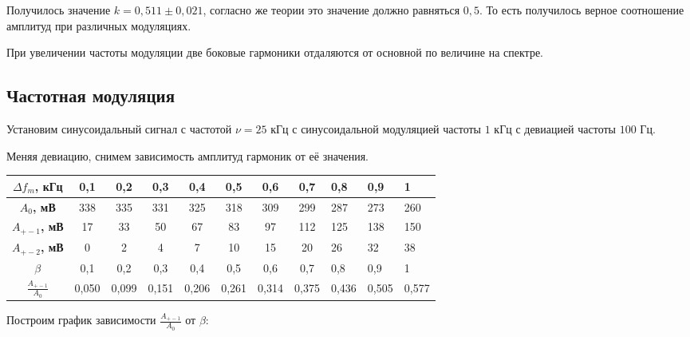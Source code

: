 Получилось значение $k = 0,511 \pm 0,021$, согласно же теории это значение должно равняться $0,5$. То есть получилось верное соотношение амплитуд при различных модуляциях.

При увеличении частоты модуляции две боковые гармоники отдаляются от основной по величине на спектре.

\subsection{Частотная модуляция}

Установим синусоидальный сигнал с частотой $\nu = 25$ кГц с синусоидальной модуляцией частоты $1$ кГц с девиацией частоты $100$ Гц.

Меняя девиацию, снимем зависимость амплитуд гармоник от её значения.

\begin{table}[h!]
    \centering
    \begin{tabular}{|c|c|c|c|c|c|c|c|l|l|l|}
        \hline
        \textbf{$\Delta f_m$, кГц}       & 0,1   & 0,2   & 0,3   & 0,4   & 0,5   & 0,6   & 0,7   & 0,8   & 0,9   & 1     \\ \hline
        \textbf{$A_0$, мВ}               & 338   & 335   & 331   & 325   & 318   & 309   & 299   & 287   & 273   & 260   \\ \hline
        \textbf{$A_{+-1}$, мВ}           & 17    & 33    & 50    & 67    & 83    & 97    & 112   & 125   & 138   & 150   \\ \hline
        \textbf{$A_{+-2}$, мВ}           & 0     & 2     & 4     & 7     & 10    & 15    & 20    & 26    & 32    & 38    \\ \hline
        \textbf{$\beta$}                 & 0,1   & 0,2   & 0,3   & 0,4   & 0,5   & 0,6   & 0,7   & 0,8   & 0,9   & 1     \\ \hline
        \textbf{$\frac{A_{+-1}}{A_{0}}$} & 0,050 & 0,099 & 0,151 & 0,206 & 0,261 & 0,314 & 0,375 & 0,436 & 0,505 & 0,577 \\ \hline
    \end{tabular}
\end{table}

Построим график зависимости $\frac{A_{+-1}}{A_{0}}$ от $\beta$:

